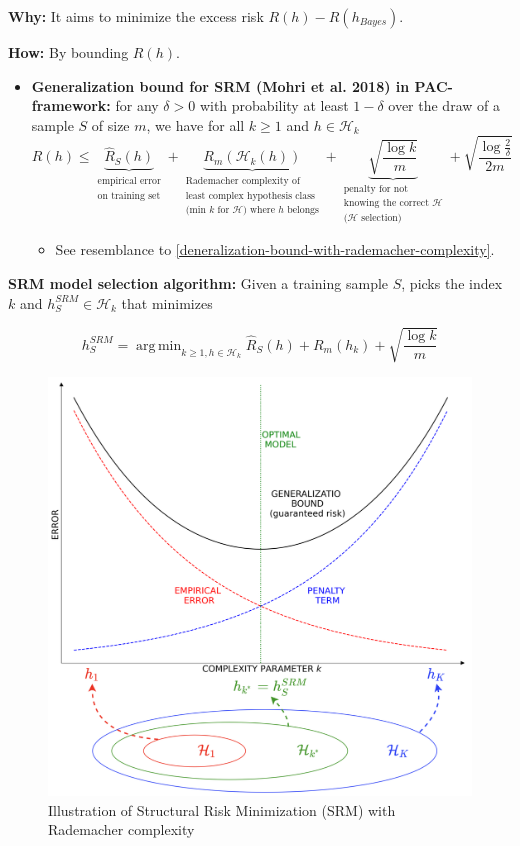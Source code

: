 \documentclass[12pt, a4paper]{article}
\DeclareMathOperator*{\argmin}{arg\,min} %
\begin{document}
\textbf{Why:} It aims to minimize the excess risk $R(h) - R(h_{Bayes})$.

\textbf{How:} By bounding $R(h)$.
\begin{itemize}
  \item \textbf{Generalization bound for SRM (Mohri et al. 2018) in PAC-framework:} for any $\delta > 0$ with probability at least $1 - \delta$ over the draw of a sample $S$ of size $m$, we have for all $k \geq 1$ and $h \in \mathcal{H}_k$
  $$
  R(h) \leq \underbrace{\hat{R}_S(h)}_{\substack{\text{empirical error} \\ \text{on training set}}} + \underbrace{R_m(\mathcal{H}_k(h))}_{\substack{\text{Rademacher complexity of} \\ \text{least complex hypothesis class} \\ \text{(min $k$ for $\mathcal{H}$) where $h$ belongs}}} + \underbrace{\sqrt{\frac{\log{k}}{m}}}_{\substack{\text{penalty for not} \\ \text{knowing the correct $\mathcal{H}$} \\ \text{($\mathcal{H}$ selection)}}} + \sqrt{\frac{\log{\frac{2}{\delta}}}{2m}}
  $$
  \begin{itemize}
    \item See resemblance	to \ref{deneralization-bound-with-rademacher-complexity}.
  \end{itemize}
\end{itemize}


\textbf{SRM model selection algorithm:} Given a training sample $S$, picks the index $k$ and $h_S^{SRM} \in \mathcal{H}_k$ that minimizes

$$
h_S^{SRM} = \argmin_{k \geq 1, h \in \mathcal{H}_k} \hat{R}_S(h) + R_m(h_k) + \sqrt{\frac{\log{k}}{m}}
$$

\begin{figure}[H]
  \centering  %
    \includegraphics[width=0.8\columnwidth]{images/generalization-bound-with-rademacher-complexity.png}
    \caption{Illustration of Structural Risk Minimization (SRM) with Rademacher complexity}
    \label{fig:generalization-bound-with-rademacher-complexity}
\end{figure}
\end{document}
